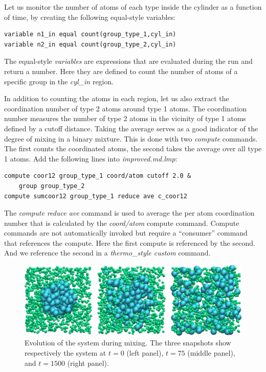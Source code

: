 \documentclass[9pt,tutorial]{livecoms}
\begin{document}
Let us monitor the number of atoms of each type inside the cylinder as a
function of time, by creating the following equal-style variables:
\begin{lstlisting}
variable n1_in equal count(group_type_1,cyl_in)
variable n2_in equal count(group_type_2,cyl_in)
\end{lstlisting}
The equal-style \textit{variables} are expressions that are evaluated
during the run and return a number.  Here they are defined to count
the number of atoms of a specific group in the \textit{cyl\_in} region.

In addition to counting the atoms in each region, let us also extract
the coordination number of type 2 atoms around type 1 atoms.  The
coordination number measures the number of type 2 atoms in the vicinity
of type 1 atoms defined by a cutoff distance.  Taking the average serves
as a good indicator of the degree of mixing in a binary mixture.  This
is done with two \textit{compute} commands.  The first counts the
coordinated atoms, the second takes the average over all type 1
atoms. Add the following lines into \textit{improved.md.lmp}:
\begin{lstlisting}
compute coor12 group_type_1 coord/atom cutoff 2.0 &
    group group_type_2
compute sumcoor12 group_type_1 reduce ave c_coor12
\end{lstlisting}
The \textit{compute reduce ave} command is used to average the per atom
coordination number that is calculated by the \textit{coord/atom}
compute command.  Compute commands are not automatically invoked but
require a ``consumer'' command that references the compute.  Here the
first compute is referenced by the second.  And we reference the second
in a \textit{thermo\_style custom} command.

\begin{figure}
\centering
\includegraphics[width=\linewidth]{LJ-evolution}
\caption{Evolution of the system during mixing. The three snapshots show
respectively the system at $t=0$ (left panel), $t=75$ (middle panel), and $t=1500$
(right panel).}
\label{fig:evolution-population}
\end{figure}
\end{document}
